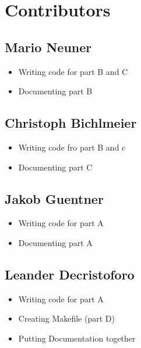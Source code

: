 \documentclass[12pt,a4paper]{article}
\begin{document}
\newpage


\section{Contributors}
\vspace{1cm}

\subsection*{\small Mario Neuner} 
\begin{itemize}
    \item Writing code for part B and C
    \item Documenting part B
\end{itemize}

\vspace{1cm}

\subsection*{\small Christoph Bichlmeier}
\begin{itemize}
    \item Writing code fro part B and c
    \item Documenting part C
\end{itemize}

\vspace{1cm}

\subsection*{\small Jakob Guentner}
\begin{itemize}
    \item Writing code for part A
    \item Documenting part A
\end{itemize}

\vspace{1cm}

\subsection*{\small Leander Decristoforo}
\begin{itemize}
    \item Writing code for part A
    \item Creating Makefile (part D)
    \item Putting Documentation together
\end{itemize}
\end{document}
